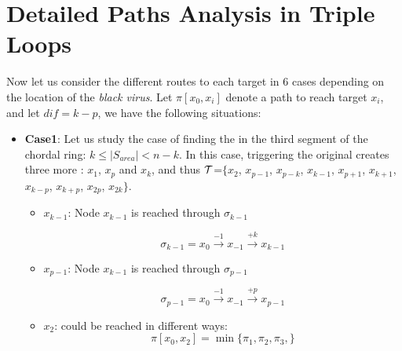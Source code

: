 


\chapter{Detailed Paths Analysis in Triple Loops}  \label{AppendixA}

Now let us consider the different routes to each target in $6$ cases depending on the location of the {\it black virus}.  Let $\pi[x_0,x_{i}] $ denote a path to reach target $x_i$, and let $dif=k-p$, we have the following situations:
\begin{itemize}
\item {\bf Case1}: Let us study the case of finding the \bv in the third segment of the chordal ring: $k\leq |S_{area}| <n-k$. In this case, triggering the original \bv creates three more \bvs: $x_{1}$, $x_{p}$ and $x_{k}$, and thus $\cal T$=$\{x_{2}$, $x_{p-1}$, $x_{p-k}$, $x_{k-1}$, $x_{p+1}$, $x_{k+1}$, $x_{k-p}$, $x_{k+p}$,  $x_{2p}$, $x_{2k}\}$. 
\begin{itemize}

\item  $x_{k-1}$:  Node  $x_{k-1}$ is reached through  $\sigma_{k-1}$
 
$$ \sigma_{k-1} =  x_{0}\xrightarrow {-1}x_{-1}\xrightarrow {+k}x_{k-1}$$


\item  $x_{p-1}$:  Node  $x_{k-1}$ is reached through $\sigma_{p-1}$
 
$$ \sigma_{p-1} =  x_{0}\xrightarrow {-1}x_{-1}\xrightarrow {+p}x_{p-1}$$


\item $x_{2}$:  could be reached in different ways:\\
$$ \pi[x_0,x_{2}] = \min \{ \pi_1, \pi_2,  \pi_3,\}$$


 \begin{itemize} 
 

\end{itemize}
\end{itemize}
\end{itemize}
